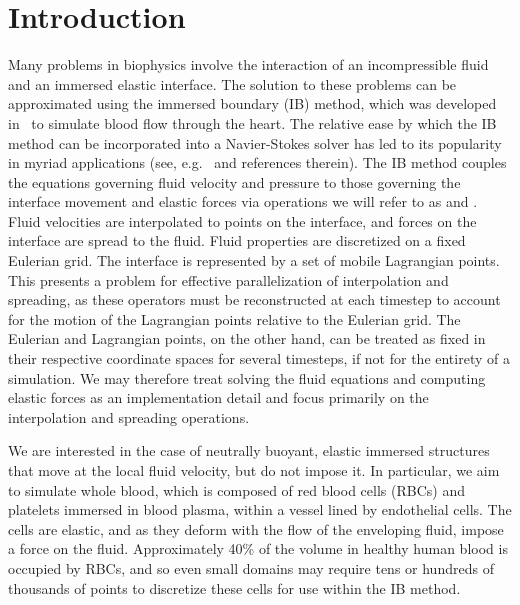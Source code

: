 \section{Introduction}

Many problems in biophysics involve the interaction of an incompressible fluid and an
immersed elastic interface. The solution to these problems can be approximated using the
immersed boundary (IB) method, which was developed in~\cite{Peskin:1972wa} to simulate
blood flow through the heart. The relative ease by which the IB method can be
incorporated into a Navier-Stokes solver has led to its popularity in myriad applications
(see, e.g.~\cite{Iaccarino:2005ii,Griffith:2020hi} and references therein).
The IB method couples the equations governing fluid velocity and pressure to those
governing the interface movement and elastic forces via operations we will refer to as
 and . Fluid velocities are interpolated to points on
the interface, and forces on the interface are spread to the fluid. Fluid properties are
discretized on a fixed Eulerian grid. The interface is represented by a set of mobile
Lagrangian points. This presents a problem for effective parallelization of interpolation
and spreading, as these operators must be reconstructed at each timestep to account for
the motion of the Lagrangian points relative to the Eulerian grid. The Eulerian and
Lagrangian points, on the other hand, can be treated as fixed in their respective
coordinate spaces for several timesteps, if not for the entirety of a simulation. We may
therefore treat solving the fluid equations and computing elastic forces as an
implementation detail and focus primarily on the interpolation and spreading operations.

We are interested in the case of neutrally buoyant, elastic immersed structures that move
at the local fluid velocity, but do not impose it. In particular, we aim to simulate
whole blood, which is composed of red blood cells (RBCs) and platelets immersed in blood
plasma, within a vessel lined by endothelial cells. The cells are elastic, and as they
deform with the flow of the enveloping fluid, impose a force on the fluid. Approximately
40\% of the volume in healthy human blood is occupied by RBCs, and so even small domains
may require tens or hundreds of thousands of points to discretize these cells for use
within the IB method.

